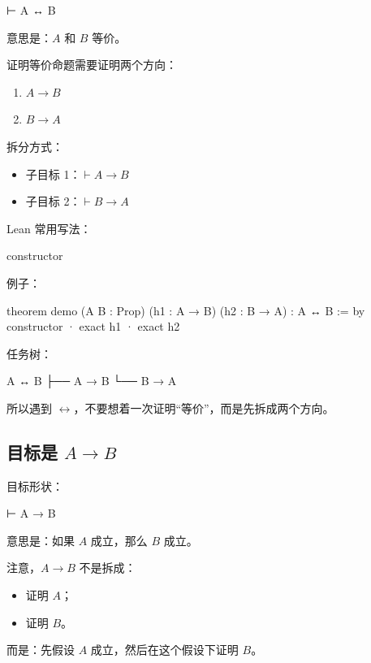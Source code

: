 \documentclass[UTF8,12pt]{ctexart}
\begin{document}
\begin{LeanCode}
⊢ A ↔ B
\end{LeanCode}

意思是：\(A\) 和 \(B\) 等价。

证明等价命题需要证明两个方向：
\begin{enumerate}
  \item \(A \to B\)
  \item \(B \to A\)
\end{enumerate}

拆分方式：
\begin{itemize}
  \item 子目标 1：\(\vdash A \to B\)
  \item 子目标 2：\(\vdash B \to A\)
\end{itemize}

Lean 常用写法：

\begin{LeanCode}
constructor
\end{LeanCode}

例子：

\begin{LeanCode}
theorem demo
  (A B : Prop)
  (h1 : A → B)
  (h2 : B → A) :
  A ↔ B := by
  constructor
  · exact h1
  · exact h2
\end{LeanCode}

任务树：

\begin{Tree}
A ↔ B
├── A → B
└── B → A
\end{Tree}

所以遇到 \(\leftrightarrow\)，不要想着一次证明“等价”，而是先拆成两个方向。

\subsection{目标是 \(A \to B\)}

目标形状：

\begin{LeanCode}
⊢ A → B
\end{LeanCode}

意思是：如果 \(A\) 成立，那么 \(B\) 成立。

注意，\(A \to B\) 不是拆成：
\begin{itemize}
  \item 证明 \(A\)；
  \item 证明 \(B\)。
\end{itemize}

而是：先假设 \(A\) 成立，然后在这个假设下证明 \(B\)。
\end{document}
